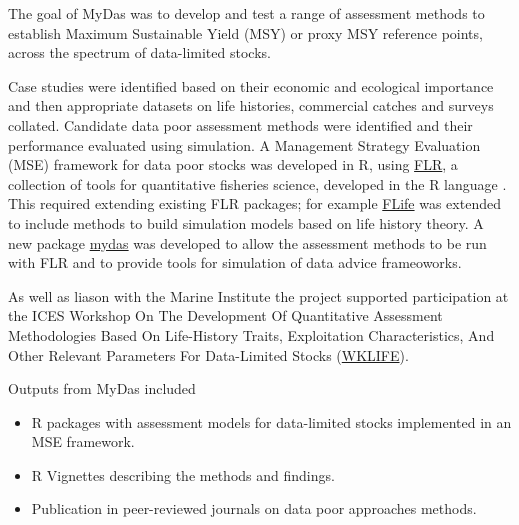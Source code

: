 
The goal of MyDas was to develop and test a range of assessment methods to establish Maximum Sustainable Yield (MSY) or proxy MSY reference points, across the spectrum of data-limited stocks. 

Case studies were identified based on their economic and ecological importance and then appropriate  datasets on life histories, commercial catches and surveys collated. Candidate data poor assessment methods were identified and their performance evaluated using simulation. A Management Strategy Evaluation (MSE) framework for data poor stocks was developed in R, using \href{http://www.flr-project.org/}{FLR}, a collection of tools for quantitative fisheries science, developed in the R language \citep{kell2007flr}. This required extending existing FLR packages; for example \href{https://github.com/flr/flife}{FLife} was extended to include methods to build simulation models based on life history theory. A new package \href{https://github.com/flr/mydas/wiki}{mydas} was developed to allow the assessment methods to be run with FLR and to provide tools for simulation of data advice frameoworks.
 

As well as liason with the Marine Institute the project supported participation at the ICES Workshop On The Development Of Quantitative Assessment Methodologies Based On Life-History Traits, Exploitation Characteristics, And Other Relevant Parameters For Data-Limited Stocks (\href{https://www.ices.dk/community/groups/Pages/WKLIFEIX.aspx}{WKLIFE}).



Outputs from MyDas included

\begin{itemize}[noitemsep,topsep=0pt,parsep=0pt,partopsep=0pt]
 \item R packages with assessment models for data-limited stocks implemented in an MSE framework. 
 \item R Vignettes describing the methods and findings.
 \item Publication in peer-reviewed journals on data poor approaches methods.
\end{itemize}

